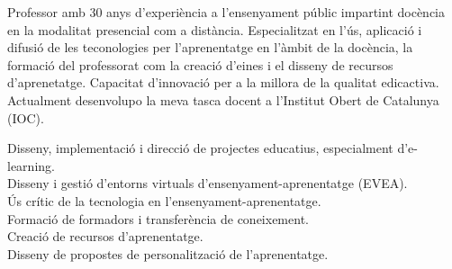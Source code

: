 \documentclass[9pt]{developercv} %
\begin{document}
\begin{minipage}[t]{0.275\textwidth} %
  \vspace{-\baselineskip} %

\end{minipage}

\vspace{0.5cm}


\begin{minipage}[t]{0.45\textwidth}
  \vspace{-\baselineskip} %


  Professor amb 30 anys d'experiència a l'ensenyament públic impartint docència en la modalitat presencial com a distància. Especialitzat en l'ús, aplicació i difusió de les teconologies per l'aprenentatge en l'àmbit de la docència, la formació del professorat com la creació d'eines i el disseny de recursos d'aprenetatge. Capacitat d'innovació per a la millora de la qualitat edicactiva.\\

  Actualment desenvolupo la meva tasca docent a l'Institut Obert de Catalunya (IOC).

\end{minipage}
\hfill
\begin{minipage}[t]{0.45\textwidth}
  \vspace{-\baselineskip} %
  
  
  Disseny, implementació i direcció de projectes educatius, especialment d’e-learning.\\
  Disseny i gestió d’entorns virtuals d’ensenyament-aprenentatge (EVEA).\\
  Ús crític de la tecnologia en l’ensenyament-aprenentatge.\\
  Formació de formadors i transferència de coneixement.\\
  Creació de recursos d’aprenentatge.\\
  Disseny de propostes de personalització de l’aprenentatge.\\

\end{minipage}
\end{document}
